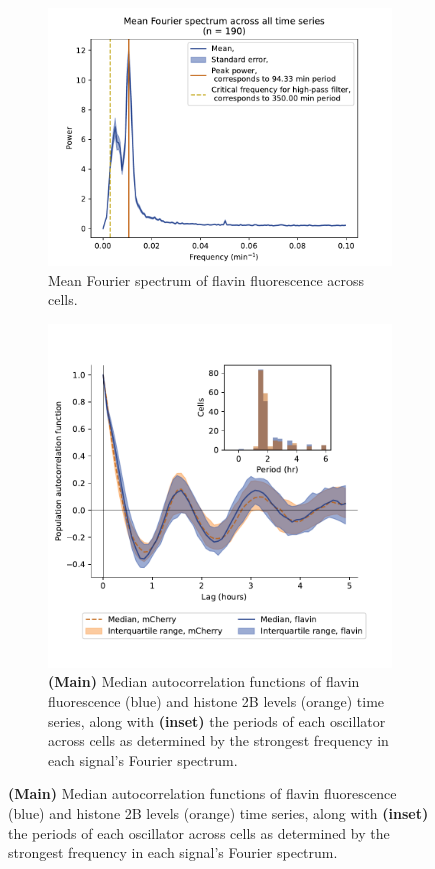 \begin{figure}
  \centering
  \begin{subfigure}[htpb]{0.4\textwidth}
   \centering
   \includegraphics[width=\textwidth]{htb2mCherry_26643_14}
   \caption{
    Mean Fourier spectrum of flavin fluorescence across cells.
   }
   \label{fig:biology-highglc-sync-fourier}
  \end{subfigure}%
  \begin{subfigure}[htpb]{0.4\textwidth}
   \centering
   \includegraphics[width=\textwidth]{htb2mCherry_26643_12}
   \caption{
     \textbf{(Main)} Median autocorrelation functions of flavin fluorescence (blue) and histone 2B levels (orange) time series,
     along with \textbf{(inset)} the periods of each oscillator across cells as determined by the strongest frequency in each signal's Fourier spectrum.
   }
   \label{fig:biology-highglc-sync-acf}
  \end{subfigure}


\end{figure}
